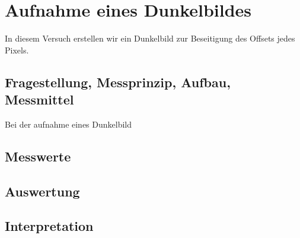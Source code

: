 %
%
\chapter{Aufnahme eines Dunkelbildes}
In diesem Versuch erstellen wir ein Dunkelbild zur Beseitigung des Offsets jedes Pixels.
\label{chap:Aufnahme_eines_Dunkelbildes}

\section{Fragestellung, Messprinzip, Aufbau, Messmittel}
Bei der aufnahme eines Dunkelbild
\label{chap:VERSUCH_2_FRAGESTELLUNG}

\section{Messwerte}
\label{chap:VERSUCH_2_MESSWERTE}

\section{Auswertung}
\label{chap:VERSUCH_2_AUSWERTUNG}

\section{Interpretation}
\label{chap:VERSUCH_2_INTERPRETATION}